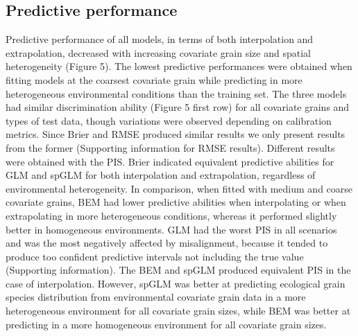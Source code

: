 \documentclass[
  12pt,
  a4paper]{article}
\begin{document}
\hypertarget{predictive-performance}{%
\subsection{Predictive performance}\label{predictive-performance}}

Predictive performance of all models, in terms of both interpolation and extrapolation, decreased with increasing covariate grain size and spatial heterogeneity (Figure 5). The lowest predictive performances were obtained when fitting models at the coarsest covariate grain while predicting in more heterogeneous environmental conditions than the training set. The three models had similar discrimination ability (Figure 5 first row) for all covariate grains and types of test data, though variations were observed depending on calibration metrics. Since Brier and RMSE produced similar results we only present results from the former (Supporting information for RMSE results). Different results were obtained with the PIS. Brier indicated equivalent predictive abilities for GLM and spGLM for both interpolation and extrapolation, regardless of environmental heterogeneity. In comparison, when fitted with medium and coarse covariate grains, BEM had lower predictive abilities when interpolating or when extrapolating in more heterogeneous conditions, whereas it performed slightly better in homogeneous environments. GLM had the worst PIS in all scenarios and was the most negatively affected by misalignment, because it tended to produce too confident predictive intervals not including the true value (Supporting information). The BEM and spGLM produced equivalent PIS in the case of interpolation. However, spGLM was better at predicting ecological grain species distribution from environmental covariate grain data in a more heterogeneous environment for all covariate grain sizes, while BEM was better at predicting in a more homogeneous environment for all covariate grain sizes.
\end{document}
